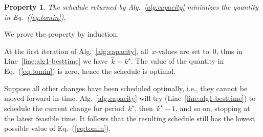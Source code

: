 \documentclass[10pt,journal,cspaper,compsoc]{IEEEtran}
\newcommand{\Eq}[1]{Eq.~(\ref{eq:#1})}
\newcommand{\Alg}[1]{Alg.~\ref{alg:#1}}
\newcommand{\Line}[1]{Line~\ref{line:#1}}
\newtheorem{property}{Property}
\begin{document}
\begin{property}
\label{prop:optimal}
The schedule returned by \Alg{capacity} minimizes the quantity in \Eq{tomin}.
\end{property}
\begin{IEEEproof}
We prove the property by induction.

At the first iteration of \Alg{capacity}, all~$x$-values are set to~$0$, thus in \Line{alg1-besttime}
we have~$\hat{k}=k^\star$. The value of the quantity in \Eq{tomin} is zero, hence the schedule is optimal.

Suppose all other changes have been scheduled optimally, i.e., they cannot be moved forward in time. \Alg{capacity}
will try (\Line{alg1-besttime}) to schedule the current change for period~$k^\star$, then~$k^\star-1$, and so on,
stopping at the latest feasible time. It follows that the resulting schedule still has the lowest possible value of \Eq{tomin}.
\end{IEEEproof}
\end{document}
